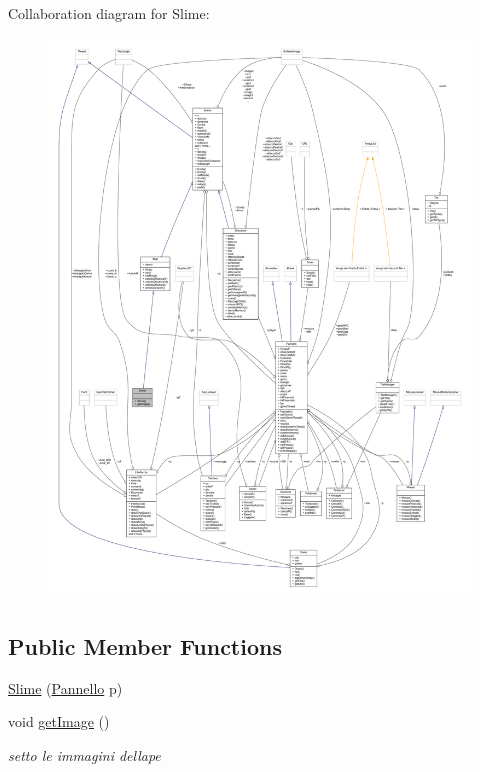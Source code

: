 Collaboration diagram for Slime\+:
\nopagebreak
\begin{figure}[H]
\begin{center}
\leavevmode
\includegraphics[width=350pt]{class_entita_1_1_slime__coll__graph}
\end{center}
\end{figure}
\subsection*{Public Member Functions}
\begin{DoxyCompactItemize}
\item 
\hyperlink{class_entita_1_1_slime_aab582adc4b82fabcf2dd0ea9012a6726}{Slime} (\hyperlink{classa_1_1survival_1_1game_1_1_pannello}{Pannello} p)
\item 
void \hyperlink{class_entita_1_1_slime_acd4bd75c24769238f365de299bde96ac}{get\+Image} ()
\begin{DoxyCompactList}\small\item\em setto le immagini dell\textquotesingle{}ape \end{DoxyCompactList}\end{DoxyCompactItemize}
